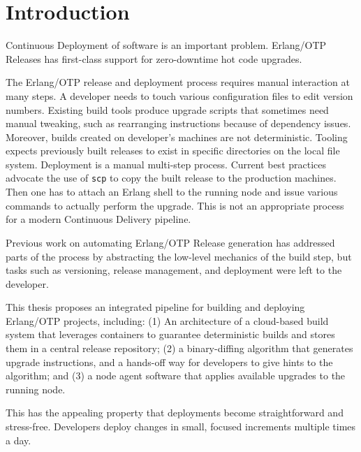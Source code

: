\chapter{Introduction}



Continuous Deployment of software is an important problem.
Erlang/OTP Releases has first-class support for zero-downtime hot code upgrades.


The Erlang/OTP release and deployment process requires manual interaction at many steps.
A developer needs to touch various configuration files to edit version numbers.
Existing build tools produce upgrade scripts that sometimes need manual tweaking, such as rearranging instructions because of dependency issues.
Moreover, builds created on developer's machines are not deterministic. Tooling expects previously built releases to exist in specific directories on the local file system.
Deployment is a manual multi-step process. Current best practices advocate the use of \lstinline{scp} to copy the built release to the production machines. Then one has to attach an Erlang shell to the running node and issue various commands to actually perform the upgrade. This is not an appropriate process for a modern Continuous Delivery pipeline.


Previous work on automating Erlang/OTP Release generation has addressed parts of the process by abstracting the low-level mechanics of the build step, but tasks such as versioning, release management, and deployment were left to the developer.


This thesis proposes an integrated pipeline for building and deploying Erlang/OTP projects, including: (1) An architecture of a cloud-based build system that leverages containers to guarantee deterministic builds and stores them in a central release repository; (2) a binary-diffing algorithm that generates upgrade instructions, and a hands-off way for developers to give hints to the algorithm; and (3) a node agent software that applies available upgrades to the running node.


This has the appealing property that deployments become straightforward and stress-free. Developers deploy changes in small, focused increments  multiple times a day.
